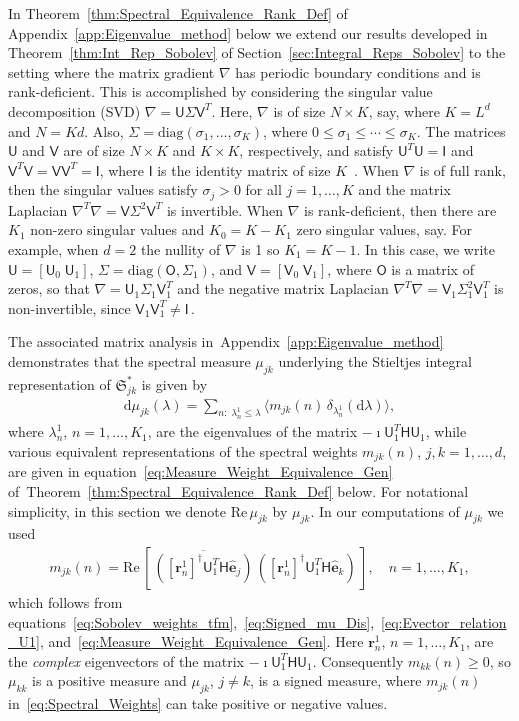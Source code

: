 \documentclass[english,12pt,jmp,graphicx]{revtex4-1}
\newcommand{\thmref}[1]{Theorem~\ref{#1}}
\newcommand{\secref}[1]{Section~\ref{#1}}
\newcommand{\appref}[1]{Appendix~\ref{#1}}
\newcommand{\Sg}{\mathfrak{S}}
\renewcommand{\d}{\mathrm{d}}
\newcommand{\Real}{\mbox{Re}\,}
\newcommand{\vecr}{\boldsymbol{r}}
\newcommand{\hate}{\hat{\mathbf{e}}}
\newcommand{\Hm}{\mathsf{H}}
\newcommand{\Um}{\mathsf{U}}
\newcommand{\Vm}{\mathsf{V}}
\newcommand{\Ib}{\mathsf{I}}
\newcommand{\Om}{\mathsf{O}}
\begin{document}
In \thmref{thm:Spectral_Equivalence_Rank_Def} of
\appref{app:Eigenvalue_method} below we extend our results developed 
in \thmref{thm:Int_Rep_Sobolev} of \secref{sec:Integral_Reps_Sobolev} to the
setting where the matrix gradient $\nabla$ has periodic boundary
conditions and is rank-deficient. This is accomplished by considering
the singular value decomposition (SVD) $\nabla=\Um\Sigma\Vm^T$.
Here, $\nabla$ is of size $N\times K$, say, where $K=L^d$ and
$N=Kd$. Also, 
$\Sigma=\text{diag}(\sigma_1,\ldots,\sigma_K)$, where
$0\leq\sigma_1\leq\cdots\leq\sigma_K$. The matrices $\Um$ and
$\Vm$ are of size $N\times K$ and $K\times K$, respectively, and
satisfy $\Um^T\Um=\Ib$ and
$\Vm^T\Vm=\Vm\Vm^T=\Ib$, where $\Ib$ is the
identity matrix of size $K$~\cite{Demmel:1997}. When $\nabla$ is of full
rank, then the singular values satisfy $\sigma_j>0$ for all
$j=1,\ldots,K$ and the matrix Laplacian
$\nabla^T\nabla=\Vm\Sigma^2\Vm^T$ is invertible. 
When $\nabla$ is rank-deficient, then there are $K_1$ non-zero
singular values and $K_0=K-K_1$ zero singular values, say. For
example, when $d=2$ the nullity of $\nabla$ is 1 so $K_1=K-1$. In
this case, we write $\Um=[\Um_0\;\Um_1]$,
$\Sigma=\text{diag}(\Om,\Sigma_1)$, and $\Vm=[\Vm_0\;\Vm_1]$, where
$\Om$ is a matrix of zeros, so that
$\nabla=\Um_1\Sigma_1\Vm_1^T$ and the negative matrix Laplacian
$\nabla^T\nabla=\Vm_1\Sigma_1^2\Vm_1^T$ is non-invertible, since
$\Vm_1\Vm_1^T\ne\Ib\,$.   



The associated matrix analysis in~\appref{app:Eigenvalue_method}
demonstrates that the spectral measure $\mu_{jk}$ underlying the Stieltjes
integral representation of $\Sg^*_{jk}$ is given by
%
\begin{align}\label{eq:Measure_weights_mjk}
   \d\mu_{jk}(\lambda)=\sum_{n:\;\lambda^1_n\leq\lambda}\langle m_{jk}(n)\,\delta_{\lambda^1_n}(\d\lambda)\rangle,
 \end{align}
%
where $\lambda_n^1$, $n=1,\ldots,K_1$, are the eigenvalues of the matrix
$-\imath\Um_1^T\Hm\Um_1$,
while various
equivalent representations of the 
spectral weights $m_{jk}(n)$, $j,k=1,\ldots,d$, are given in
equation~\eqref{eq:Measure_Weight_Equivalence_Gen}
of~\thmref{thm:Spectral_Equivalence_Rank_Def} below. For notational 
simplicity, in this section we denote $\Real\mu_{jk}$ by $\mu_{jk}$.
In our computations of $\mu_{jk}$ we used 
%
\begin{align}\label{eq:Spectral_Weights}
  m_{jk}(n)=\Real[\,\overline{([\vecr_n^1]^\dagger\Um_1^T\Hm\hate_j)}\,
                         ([\vecr_n^1]^\dagger\Um_1^T\Hm\hate_k)\,],
  \quad
  n=1,\ldots,K_1,
\end{align}
%
which follows from
equations~\eqref{eq:Sobolev_weights_tfm},~\eqref{eq:Signed_mu_Dis},~\eqref{eq:Evector_relation_U1},  
and~\eqref{eq:Measure_Weight_Equivalence_Gen}. Here 
$\vecr_n^1$, $n=1,\ldots,K_1$, are the \emph{complex} eigenvectors of the
matrix $-\imath\Um_1^T\Hm\Um_1$. Consequently $m_{kk}(n)\ge0$, so
$\mu_{kk}$ is a positive measure and $\mu_{jk}$, $j\neq k$, is a
signed measure, where $m_{jk}(n)$ in~\eqref{eq:Spectral_Weights} can
take positive or negative values.
\end{document}

